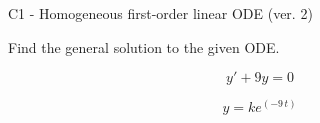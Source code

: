 \begin{exercise}
  \begin{exerciseTitle}C1 - Homogeneous first-order linear ODE (ver. 2)\end{exerciseTitle}
  \begin{exerciseStatement}
    
Find the general solution to the given ODE.

    
\[y'+9y=0\]

  \end{exerciseStatement}
  \begin{exerciseAnswer}
    
\[y= k e^{\left(-9 \, t\right)}\]

  \end{exerciseAnswer}
\end{exercise}